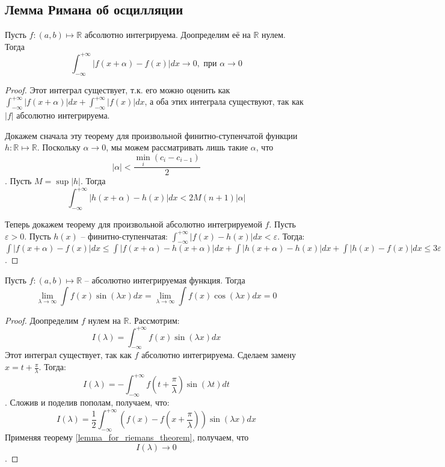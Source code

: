 \documentclass[document.tex]{subfiles}
\begin{document}
\subsection{Лемма Римана об осцилляции}
\begin{theorem}
    \label{lemma_for_riemans_theorem}
Пусть $f: (a, b) \mapsto \mathbb{R}$ абсолютно интегрируема. Доопределим её на $\mathbb{R}$ нулем. Тогда $$\int_{-\infty}^{+\infty} |f(x + \alpha) - f(x)|dx \rightarrow 0, \text{ при } \alpha \rightarrow 0$$
\end{theorem}
\begin{proof}
Этот интеграл существует, т.к. его можно оценить как $\int_{-\infty}^{+\infty}|f(x+\alpha)|dx +
\int_{-\infty}^{+\infty}|f(x)|dx$, а оба этих интеграла существуют, так как $|f|$ абсолютно интегрируема.

Докажем сначала эту теорему для произвольной финитно-ступенчатой функции $h: \mathbb{R} \mapsto \mathbb{R}$. Поскольку $\alpha \rightarrow 0$, мы можем рассматривать лишь такие $\alpha$, что $$|\alpha| < \frac{\min_i (c_i - c_{i-1})}{2}$$. Пусть $M = \sup |h|$. Тогда
$$\int_{-\infty}^{+\infty} |h(x + \alpha) - h(x)|dx < 2M(n+1)|\alpha|$$

Теперь докажем теорему для произвольной абсолютно интегрируемой $f$. Пусть $\varepsilon > 0$. Пусть $h(x)$ --
финитно-ступенчатая: $\int_{-\infty}^{+\infty}|f(x) - h(x)|dx < \varepsilon$. Тогда:
$\int |f(x+\alpha) - f(x)|dx \leq \int|f(x+\alpha)-h(x+\alpha)|dx + \int|h(x+\alpha)-h(x)|dx + \int|h(x)-f(x)|dx \leq 3\varepsilon$.
\end{proof}

\begin{lemma}
Пусть $f : (a, b) \mapsto \mathbb{R}$ -- абсолютно интегрируемая функция. Тогда
$$\lim_{\lambda \rightarrow \infty} \int f(x)\sin (\lambda x)dx = \lim_{\lambda \rightarrow \infty} \int f(x)\cos (\lambda x)dx = 0$$
\end{lemma}
\begin{proof}
Доопределим $f$ нулем на $\mathbb{R}$. Рассмотрим:
$$I(\lambda) = \int_{-\infty}^{+\infty}f(x)\sin(\lambda x)dx$$
Этот интеграл существует, так как $f$ абсолютно интегрируема. Сделаем замену $x = t + \frac{\pi}{\lambda}$.
Тогда:
$$I(\lambda) = -\int_{-\infty}^{+\infty}f \left( t + \frac{\pi}{\lambda} \right) \sin(\lambda t)dt$$.
Сложив и поделив пополам, получаем, что:
$$I(\lambda) = \frac{1}{2} \int_{-\infty}^{+\infty} \left( f(x) - f \left( x+\frac{\pi}{\lambda} \right) \right) \sin(\lambda x)dx$$
Применяя теорему \ref{lemma_for_riemans_theorem}, получаем, что $$I(\lambda) \rightarrow 0$$.
\end{proof}
\end{document}
